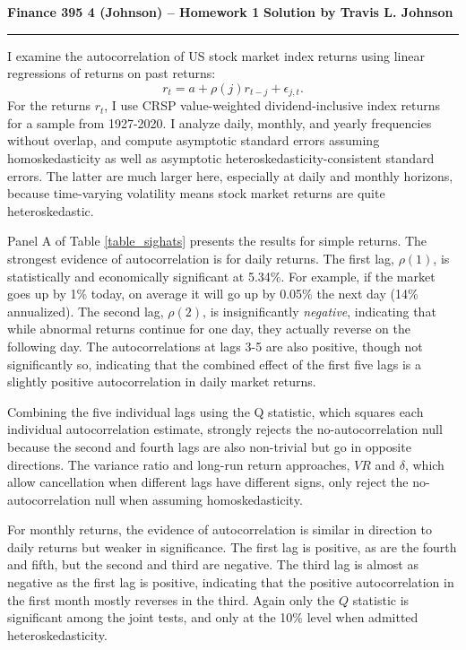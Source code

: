 \documentclass[12pt]{article}
\begin{document}
\thispagestyle{empty}
\begin{center}
{\Large \textbf{Finance 395 4 (Johnson) -- Homework 1}}
\vskip 12pt
{\normalsize \textbf{Solution by Travis L. Johnson}}
\end{center}
\hrule
\doublespacing

\vskip 16pt


I examine the autocorrelation of US stock market index returns using linear regressions of returns on past returns:
$$r_{t} = a + \rho(j) r_{t-j} + \epsilon_{j,t}.$$
For the returns $r_t$, I use CRSP value-weighted dividend-inclusive index returns for a sample from 1927-2020. I analyze daily, monthly, and yearly frequencies without overlap, and compute asymptotic standard errors assuming homoskedasticity as well as asymptotic heteroskedasticity-consistent standard errors. The latter are much larger here, especially at daily and monthly horizons, because time-varying volatility means stock market returns are quite heteroskedastic.

Panel A of Table \ref{table_sighats} presents the results for simple returns. The strongest evidence of autocorrelation is for daily returns. The first lag, $\rho(1)$, is statistically and economically significant at 5.34\%. For example, if the market goes up by 1\% today, on average it will go up by 0.05\% the next day (14\% annualized). The second lag, $\rho(2)$, is insignificantly \textit{negative}, indicating that while abnormal returns continue for one day, they actually reverse on the following day. The autocorrelations at lags 3-5 are also positive, though not significantly so, indicating that the combined effect of the first five lags is a slightly positive autocorrelation in daily market returns.

Combining the five individual lags using the \cite{box1970distribution} Q statistic, which squares each individual autocorrelation estimate, strongly rejects the no-autocorrelation null because the second and fourth lags are also non-trivial but go in opposite directions. The variance ratio and long-run return approaches, $VR$ and $\delta$, which allow cancellation when different lags have different signs, only reject the no-autocorrelation null when assuming homoskedasticity.

For monthly returns, the evidence of autocorrelation is similar in direction to daily returns but weaker in significance. The first lag is positive, as are the fourth and fifth, but the second and third are negative. The third lag is almost as negative as the first lag is positive, indicating that the positive autocorrelation in the first month mostly reverses in the third. Again only the $Q$ statistic is significant among the joint tests, and only at the 10\% level when admitted heteroskedasticity.
\end{document}
